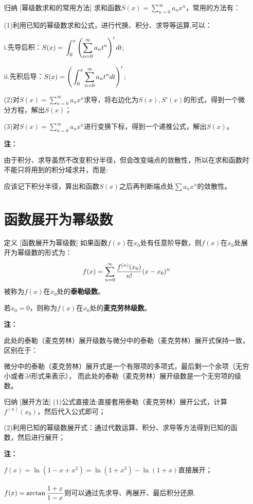 \documentclass[a4paper,12pt,oneside,fontset=none]{ctexbook}
\let\olddfrac\dfrac
\renewcommand{\dfrac}[2]{
    \olddfrac{#1\vrule width 0pt height 1.15em depth 0em}{#2\vrule width 0pt height 0em depth 0.6em}
}
\let\oldint\int
\renewcommand{\int}{\displaystyle{\vrule width 0pt height 0em depth 0em}\oldint}
\let\oldsum\sum
\renewcommand{\sum}{\displaystyle\oldsum}
\newenvironment{induction}[1][]{\begin{thmBox}{归纳}{#1}}{\end{thmBox}}
\newcounter{definition}[chapter]
\newenvironment{definition}[1][]{\begin{defBox}{定义}{#1}}{\end{defBox}}
\newenvironment{note}{
    \par\vspace{0.5em}\noindent
    \textbf{\color{NoteColor} 注：}
}{
    \par\vspace{0.5em}
}
\numberwithin{equation}{chapter}
\begin{document}
\begin{induction}
    [幂级数求和的常用方法]
    求和函数$S(x) = \sum_{n=0}^{\infty} a_n x^n$，常用的方法有：
    
    (1)利用已知的幂级数求和公式，进行代换、积分、求导等运算,可以：
    
    i.先导后积：$S(x) = \int_{0}^{x} \left( \sum_{n=0}^{\infty} a_n t^n \right)' dt;$

    ii.先积后导：$S(x) = \left( \int_{0}^{x} \sum_{n=0}^{\infty} a_n t^n dt \right)';$

    (2)对$S(x) = \sum_{n=0}^{\infty} a_n x^n$求导，将右边化为$S(x),S'(x)$的形式，得到一个微分方程，解出$S(x)$；

    (3)对$S(x) = \sum_{n=0}^{\infty} a_n x^n$进行变换下标，得到一个递推公式，解出$S(x)$。
\end{induction}
\begin{note}
    由于积分、求导虽然不改变积分半径，但会改变端点的敛散性，所以在求和函数时不能只将用到的积分域求并，而是:
    
    应该记下积分半径，算出和函数$S(x)$之后再判断端点处$\sum a_n x^n$的敛散性。
\end{note}



\section{函数展开为幂级数}
\begin{definition}
    [函数展开为幂级数]
    如果函数$f(x)$在$x_0$处有任意阶导数，则$f(x)$在$x_0$处展开为幂级数的形式为：
    $$f(x) = \sum_{n=0}^{\infty} \dfrac{f^{(n)}(x_0)}{n!}(x-x_0)^n$$
    被称为$f(x)$在$x_0$处的\textbf{泰勒级数}。
    
    若$x_0 = 0$，则称为$f(x)$在$x_0$处的\textbf{麦克劳林级数}。
\end{definition}
\begin{note}
    此处的泰勒（麦克劳林）展开级数与微分中的泰勒（麦克劳林）展开式保持一致，区别在于：
    
    微分中的泰勒（麦克劳林）展开式是一个有限项的多项式，最后剩一个余项（无穷小或者$\exists \delta$形式来表示），
    而此处的泰勒（麦克劳林）展开级数是一个无穷项的级数。
\end{note}

\begin{induction}
    [展开方法]
    (1)公式直接法:直接套用泰勒（麦克劳林）展开公式，计算$f^{(n)}(x_0)$，然后代入公式即可；
    
(2)利用已知的幂级数展开式：通过代数运算、积分、求导等方法得到已知的函数，然后进行展开；
\end{induction}
\begin{note}
    $f(x) = \ln (1-x+x^2) = \ln(1+x^3) - \ln(1+x)$直接展开；
    
    $f(x) = \arctan\dfrac{1+x}{1-x} $则可以通过先求导、再展开、最后积分还原.
\end{note}
\end{document}
